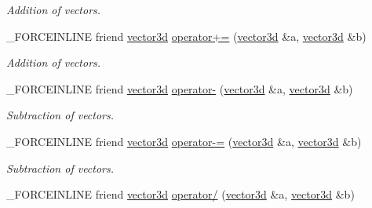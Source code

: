 \begin{DoxyCompactItemize}
\begin{DoxyCompactList}\small\item\em Addition of vectors. \end{DoxyCompactList}\item 
\hypertarget{classbt_1_1vector3d_af33e432d4859a9a53c2c284013ce054b}{\-\_\-\-F\-O\-R\-C\-E\-I\-N\-L\-I\-N\-E friend \hyperlink{classbt_1_1vector3d}{vector3d} \hyperlink{classbt_1_1vector3d_af33e432d4859a9a53c2c284013ce054b}{operator+=} (\hyperlink{classbt_1_1vector3d}{vector3d} \&a, \hyperlink{classbt_1_1vector3d}{vector3d} \&b)}\label{classbt_1_1vector3d_af33e432d4859a9a53c2c284013ce054b}

\begin{DoxyCompactList}\small\item\em Addition of vectors. \end{DoxyCompactList}\item 
\hypertarget{classbt_1_1vector3d_a20d5582004c9df333c2b86c794db9567}{\-\_\-\-F\-O\-R\-C\-E\-I\-N\-L\-I\-N\-E friend \hyperlink{classbt_1_1vector3d}{vector3d} \hyperlink{classbt_1_1vector3d_a20d5582004c9df333c2b86c794db9567}{operator-\/} (\hyperlink{classbt_1_1vector3d}{vector3d} \&a, \hyperlink{classbt_1_1vector3d}{vector3d} \&b)}\label{classbt_1_1vector3d_a20d5582004c9df333c2b86c794db9567}

\begin{DoxyCompactList}\small\item\em Subtraction of vectors. \end{DoxyCompactList}\item 
\hypertarget{classbt_1_1vector3d_a6d327f9e1b187a89c008beedcb5c8f97}{\-\_\-\-F\-O\-R\-C\-E\-I\-N\-L\-I\-N\-E friend \hyperlink{classbt_1_1vector3d}{vector3d} \hyperlink{classbt_1_1vector3d_a6d327f9e1b187a89c008beedcb5c8f97}{operator-\/=} (\hyperlink{classbt_1_1vector3d}{vector3d} \&a, \hyperlink{classbt_1_1vector3d}{vector3d} \&b)}\label{classbt_1_1vector3d_a6d327f9e1b187a89c008beedcb5c8f97}

\begin{DoxyCompactList}\small\item\em Subtraction of vectors. \end{DoxyCompactList}\item 
\hypertarget{classbt_1_1vector3d_a37d6d70cf98694595095f716b18b020f}{\-\_\-\-F\-O\-R\-C\-E\-I\-N\-L\-I\-N\-E friend \hyperlink{classbt_1_1vector3d}{vector3d} \hyperlink{classbt_1_1vector3d_a37d6d70cf98694595095f716b18b020f}{operator/} (\hyperlink{classbt_1_1vector3d}{vector3d} \&a, \hyperlink{classbt_1_1vector3d}{vector3d} \&b)}\label{classbt_1_1vector3d_a37d6d70cf98694595095f716b18b020f}


\end{DoxyCompactItemize}
